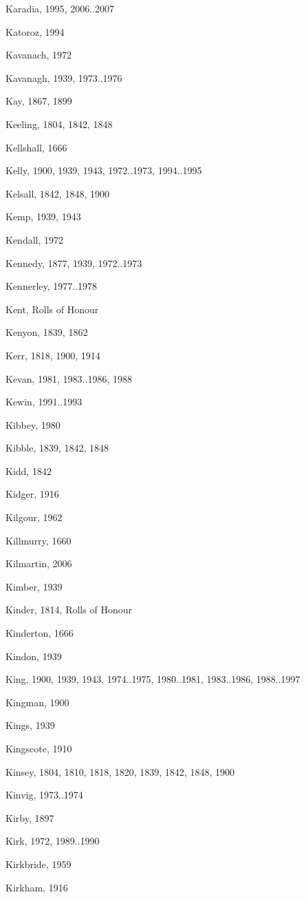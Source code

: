{\begin{theindex}
\item Karadia, 1995, 2006..2007
\item Katoroz, 1994
\item Kavanach, 1972
\item Kavanagh, 1939, 1973..1976
\item Kay, 1867, 1899
\item Keeling, 1804, 1842, 1848
\item Kellshall, 1666
\item Kelly, 1900, 1939, 1943, 1972..1973, 1994..1995
\item Kelsall, 1842, 1848, 1900
\item Kemp, 1939, 1943
\item Kendall, 1972
\item Kennedy, 1877, 1939, 1972..1973
\item Kennerley, 1977..1978
\item Kent, Rolls of Honour
\item Kenyon, 1839, 1862
\item Kerr, 1818, 1900, 1914
\item Kevan, 1981, 1983..1986, 1988
\item Kewin, 1991..1993
\item Kibbey, 1980
\item Kibble, 1839, 1842, 1848
\item Kidd, 1842
\item Kidger, 1916
\item Kilgour, 1962
\item Killmurry, 1660
\item Kilmartin, 2006
\item Kimber, 1939
\item Kinder, 1814, Rolls of Honour
\item Kinderton, 1666
\item Kindon, 1939
\item King, 1900, 1939, 1943, 1974..1975, 1980..1981, 1983..1986, 1988..1997
\item Kingman, 1900
\item Kings, 1939
\item Kingscote, 1910
\item Kinsey, 1804, 1810, 1818, 1820, 1839, 1842, 1848, 1900
\item Kinvig, 1973..1974
\item Kirby, 1897
\item Kirk, 1972, 1989..1990
\item Kirkbride, 1959
\item Kirkham, 1916

\end{theindex}}

